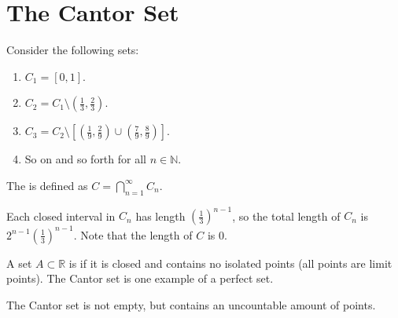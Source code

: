 \section{The Cantor Set}
Consider the following sets: 
\begin{enumerate}
\item $C_1 = [0,1]$. 
\item $C_2 = C_1 \setminus (\frac{1}{3}, \frac{2}{3})$. 
\item $C_3 = C_2 \setminus [(\frac{1}{9}, \frac{2}{9}) \cup (\frac{7}{9}, \frac{8}{9})]$. 
\item So on and so forth for all $n \in \mathbb{N}$.
\end{enumerate}
\begin{definition}
The  is defined as $C = \displaystyle\bigcap_{n=1}^\infty C_n$. 
\end{definition}
Each closed interval in $C_n$ has length $(\frac{1}{3})^{n-1}$, so the total length of $C_n$ is $2^{n-1}(\frac{1}{3})^{n-1}$. Note that the length of $C$ is 0.
\begin{definition}
A set $A \subset \mathbb{R}$ is  if it is closed and contains no isolated points (all points are limit points). The Cantor set is one example of a perfect set. 
\end{definition}
The Cantor set is not empty, but contains an uncountable amount of points.  


